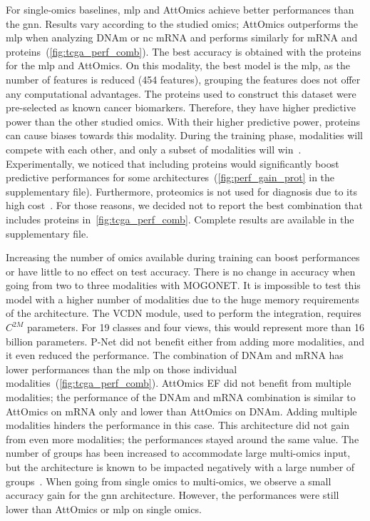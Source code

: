 \documentclass[../main.tex]{subfiles}
\begin{document}
     For single-omics baselines, \gls{mlp} and AttOmics achieve better performances than the \gls{gnn}.
     Results vary according to the studied omics; AttOmics outperforms the \gls{mlp} when analyzing DNAm or nc mRNA and performs similarly for mRNA and proteins~(\cref{fig:tcga_perf_comb}).
     The best accuracy is obtained with the proteins for the \gls{mlp} and AttOmics.
     On this modality, the best model is the \gls{mlp}, as the number of features is reduced (454 features), grouping the features does not offer any computational advantages.
     The proteins used to construct this dataset were pre-selected as known cancer biomarkers.
     Therefore, they have higher predictive power than the other studied omics.
     With their higher predictive power, proteins can cause biases towards this modality.
     During the training phase, modalities will compete with each other, and only a subset of modalities will win~\cite{pmlr-v162-huang22e}.
     Experimentally, we noticed that including proteins would significantly boost predictive performances for some architectures~(\cref{fig:perf_gain_prot} in the supplementary file).
     Furthermore, proteomics is not used for diagnosis due to its high cost~\cite{Mundt2023}.
     For those reasons, we decided not to report the best combination that includes proteins in~\cref{fig:tcga_perf_comb}.
     Complete results are available in the supplementary file.

     Increasing the number of omics available during training can boost performances or have little to no effect on test accuracy.
     There is no change in accuracy when going from two to three modalities with MOGONET.
     It is impossible to test this model with a higher number of modalities due to the huge memory requirements of the architecture.
     The VCDN module, used to perform the integration, requires \(C^{2M}\) parameters.
     For 19 classes and four views, this would represent more than 16 billion parameters.
     P-Net did not benefit either from adding more modalities, and it even reduced the performance.
     The combination of DNAm and mRNA has lower performances than the \gls{mlp} on those individual modalities~(\cref{fig:tcga_perf_comb}).
     AttOmics EF did not benefit from multiple modalities; the performance of the DNAm and mRNA combination is similar to AttOmics on mRNA only and lower than AttOmics on DNAm.
     Adding multiple modalities hinders the performance in this case.
     This architecture did not gain from even more modalities; the performances stayed around the same value.
     The number of groups has been increased to accommodate large multi-omics input, but the architecture is known to be impacted negatively with a large number of groups~\cite{AttOmics}.
     When going from single omics to multi-omics, we observe a small accuracy gain for the \gls{gnn} architecture.
     However, the performances were still lower than AttOmics or \gls{mlp} on single omics.
\end{document}
